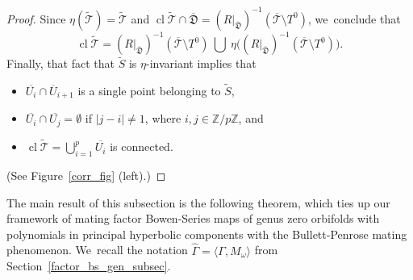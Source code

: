 \documentclass[JEP,XML,SOM,Unicode,NoFloatCountersInSection,published]{cedram}
\theoremstyle{definition}
\theoremstyle{remark}
\newcommand{\Z}{\mathbb{Z}}
\DeclareMathOperator{\Cl}{cl}
\begin{document}
\begin{proof}
Since $\eta(\widetilde{\mathcal{T}})=\widetilde{\mathcal{T}}$ and $\Cl{\widetilde{\mathcal{T}}}\cap\overline{\mathfrak{D}}= (R\vert_{\overline{\mathfrak{D}}})^{-1}(\overline{\mathcal{T}}\setminus T^0)$, we~conclude that\vspace*{-3pt}\enlargethispage{.8\baselineskip}
\[
\Cl{\widetilde{\mathcal{T}}}=(R\vert_{\overline{\mathfrak{D}}})^{-1}(\overline{\mathcal{T}}\setminus T^0)\ \bigcup\ \eta\bigl((R\vert_{\overline{\mathfrak{D}}})^{-1}(\overline{\mathcal{T}}\setminus T^0)\bigr).
\]
Finally, that fact that $\widetilde{S}$ is $\eta$-invariant implies that
\begin{itemize}
\item $\overline{U_i}\cap \overline{U}_{i+1}$ is a single point belonging to $\widetilde{S}$,
\item $\overline{U_i}\cap \overline{U_j}=\emptyset$ if $\vert j-i\vert\neq1$, where $i,j\in\Z/p\Z$, and
\item $\Cl{\widetilde{\mathcal{T}}}=\bigcup_{i=1}^p \overline{U_i}$ is connected.
\end{itemize}
(See Figure~\ref{corr_fig} (left).)
\end{proof}

The main result of this subsection is the following theorem, which ties up our framework of mating factor Bowen-Series maps of genus zero orbifolds with polynomials in principal hyperbolic components with the Bullett-Penrose mating phenomenon. We~recall the notation $\widehat{\Gamma}=\langle\Gamma,M_\omega\rangle$ from Section~\ref{factor_bs_gen_subsec}.
\end{document}
